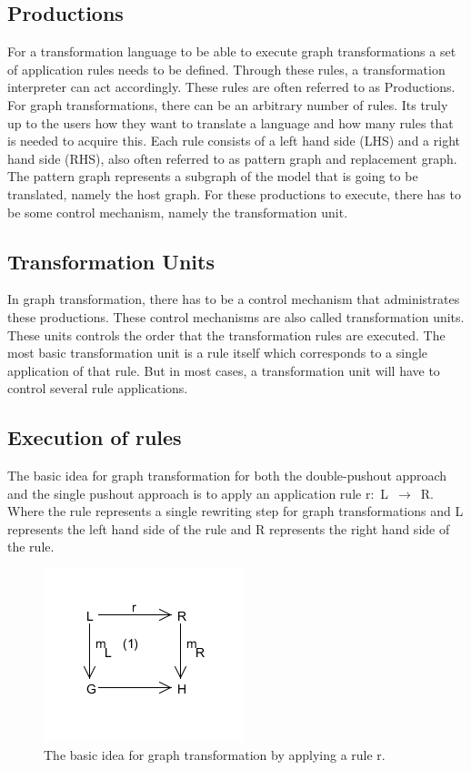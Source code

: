 \subsection{Productions}
For a transformation language to be able to execute graph
transformations a set of application rules needs to be defined. Through these
rules, a transformation interpreter can act accordingly. These rules are often
referred to as Productions. For graph transformations, there can be an arbitrary
number of rules. Its truly up to the users how they want to translate a
language and how many rules that is needed to acquire this. Each rule consists
of a left hand side (LHS) and a right hand side (RHS), also often referred to as
pattern graph and replacement graph. The pattern graph represents a subgraph of
the model that is going to be translated, namely the host graph. For these
productions to execute, there has to be some control mechanism, namely the
transformation unit.

\subsection{Transformation Units}
In graph transformation, there has to be a control mechanism that
administrates these productions. These control mechanisms are also called
transformation units. These units controls the order that the transformation
rules are executed. The most basic transformation unit is a rule itself which
corresponds to a single application of that rule. But in most cases, a
transformation unit will have to control several rule applications. 

\subsection{Execution of rules}
The basic idea for graph transformation for both the double-pushout
approach and the single pushout approach is to apply an application rule
\mbox{r: L $\longrightarrow$ R}. Where the rule represents a single rewriting
step for graph transformations and L represents the left hand side of the rule and R
represents the right hand side of the rule.

\begin{figure}[H]
	\centering
	\includegraphics[scale=0.7]{./Figures/Single_Pushout.png}
	\caption[Idea of graph transformation]
	{The basic idea for graph transformation by applying a rule r.}
	\label{fig:GraphTransformationGeneral}
\end{figure}

